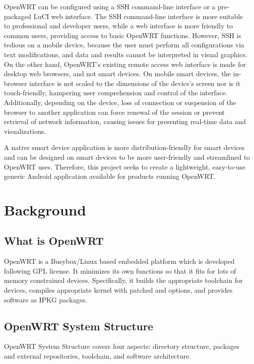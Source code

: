\documentclass{sig-alternate-05-2015}
\begin{document}
	OpenWRT can be configured using a SSH command-line interface or a pre-packaged LuCI web interface. The SSH command-line interface is more suitable to professional and developer users, while a web interface is more friendly to common users, providing access to basic OpenWRT functions. However, SSH is tedious on a mobile device, because the user must perform all configurations via text modifications, and data and results cannot be interpreted in visual graphics. On the other hand, OpenWRT's existing remote access web interface is made for desktop web browsers, and not smart devices. On mobile smart devices, the in-browser interface is not scaled to the dimensions of the device's screen nor is it touch-friendly, hampering user comprehension and control of the interface. Additionally, depending on the device, loss of connection or suspension of the browser to another application can force renewal of the session or prevent retrieval of network information, causing issues for presenting real-time data and visualizations.
	
	A native smart device application is more distribution-friendly for smart devices and can be designed on smart devices to be more user-friendly and streamlined to OpenWRT uses. Therefore, this project seeks to create a lightweight, easy-to-use generic Android application available for products running OpenWRT.
	
	\section{Background}
	
	\subsection{What is OpenWRT}
	OpenWRT \cite{fainelli2008OpenWRT, kim2014implementation} is a Busybox/Linux based embedded platform which is developed following GPL license. It minimizes its own functions so that it fits for lots of memory constrained devices. Specifically, it builds the appropriate toolchain for devices, compiles appropriate kernel with patched and options, and provides software as IPKG packages.
	
	\subsection{OpenWRT System Structure}
	OpenWRT System Structure covers four aspects: directory structure, packages and external repositories, toolchain, and software architecture.
	
\end{document}
